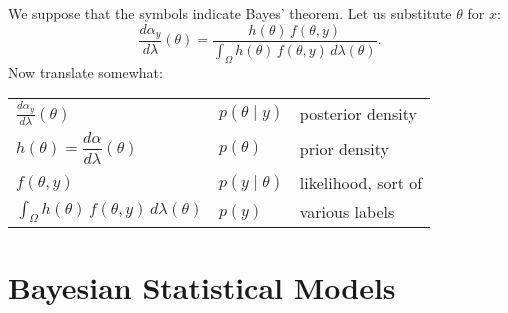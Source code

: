 \documentclass[
twoside=true,
paper=letter,
fontsize=9pt,
pagesize=auto,
leqno,
openany,
headsepline,
overfullrule,
]{scrbook}
\theoremstyle{plain}
\theoremstyle{plain}
\theoremstyle{definition}
\theoremstyle{bfnoteitalic}
\theoremstyle{bfnoteroman}
\newcommand{\funcf}{f}
\newcommand{\funch}{h}
\newcommand{\measlambda}{\lambda}
\newcommand{\pspaceelt}{x}
\newcommand{\marginalone}{\alpha}%
\newcommand{\prior}{\marginalone}
\begin{document}
We suppose that the symbols indicate Bayes' theorem.
Let us substitute $\theta$ for $\pspaceelt$:
\begin{equation}\label{loose}
\frac{d \prior_y}{d\measlambda}(\theta)
=
\frac{\funch(\theta)\,\funcf(\theta,y)}
{\displaystyle
\int_{\Omega} \funch(\theta)\, \funcf(\theta,y)
\,d\measlambda(\theta)}.
\end{equation}
Now translate somewhat:
\begin{center}
\renewcommand{\arraystretch}{1.6}
\begin{tabular}{lll}
\toprule
$\displaystyle\frac{d \prior_y}{d\measlambda}(\theta)$ & $p(\theta\mid y)$ & posterior density \\
$\funch(\theta) = \dfrac{d\prior}{d\measlambda}(\theta)$
& $p(\theta)$ & prior density \\
$\funcf(\theta,y)$ & $p(y\mid\theta)$ & likelihood, sort of \\
$\int_{\Omega} \funch(\theta)\,\funcf(\theta,y)\,d\measlambda(\theta)$ & $p(y)$ & various labels \\
\bottomrule
\end{tabular}
\end{center}









\chapter{Bayesian Statistical Models}\label{bayesian_statistical_models_examples}


\end{document}
